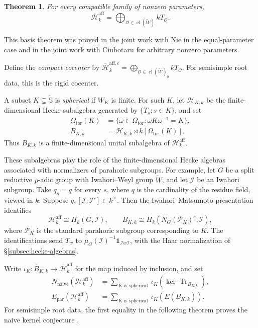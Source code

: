 \documentclass[11pt,letterpaper]{amsart}
\newtheorem{theorem}{Theorem}
\theoremstyle{definition}
\numberwithin{equation}{section}
\numberwithin{theorem}{section}
\newcommand{\kk}{k}
\newcommand{\CI}{\mathcal I}
\newcommand{\cH}{\mathcal H}
\newcommand{\bH}{\overline{\mathcal H}}
\newcommand{\cO}{\mathcal O}
\newcommand{\Wt}{\tilde W}
\newcommand{\Saff}{\widetilde{\mathbb S}}
\newcommand{\naive}{\mathrm{naive}}
\DeclareMathOperator{\Tr}{Tr}
\begin{document}
\begin{theorem}
\label{thm:affine-cocenter-basis}
For every compatible family of nonzero parameters,
\[
 \bH_\kk^{\mathrm{aff}}
   =\bigoplus_{\cO\in\operatorname{cl}(\Wt)}
      \kk T_\cO.
\]
\end{theorem}

This basis theorem was proved in the joint work with Nie \cite[Theorem~6.7]{HN14} in the equal-parameter case and in the joint work with Ciubotaru \cite[Theorem~8.1]{CH} for arbitrary nonzero parameters. 

Define the \emph{compact cocenter} by $\bH_\kk^{\mathrm{aff},c}=\bigoplus_{\cO\in\operatorname{cl}(\Wt)_0} \kk T_\cO$. For semisimple root data, this is the rigid cocenter.

A subset $K\subseteq\Saff$ is \emph{spherical} if $W_K$
is finite. For such $K$, let $\cH_{K,\kk}$ be the finite-dimensional Hecke subalgebra generated by $\{T_s:s\in K\}$, and set
\[
 \begin{aligned}
 \Omega_{\mathrm{tor}}(K)
   &=\{\omega\in\Omega_{\mathrm{tor}}:
                        \omega K\omega^{-1}=K\},\\
 B_{K,\kk}
   &=\cH_{K,\kk}\rtimes
                       \kk[\Omega_{\mathrm{tor}}(K)].
 \end{aligned}
\]
Thus $B_{K,\kk}$ is a finite-dimensional unital
subalgebra of $\cH_\kk^{\mathrm{aff}}$. 

These subalgebras play the role of the finite-dimensional Hecke algebras associated with normalizers of parahoric subgroups. For example, let $G$
be a split reductive $p$-adic group with Iwahori--Weyl
group $\Wt$, and let $\CI$ be an Iwahori subgroup.
Take $q_s=q$ for every $s$, where $q$ is the cardinality of the residue field, viewed in $\kk$. Suppose $q, [\CI:\CI']\in\kk^\times$. Then the Iwahori--Matsumoto
presentation identifies
\[
 \cH_\kk^{\mathrm{aff}}\cong H_\kk(G,\CI),
 \qquad
 B_{K,\kk}\cong
 H_\kk(N_G(\mathcal P_K)^c,\CI),
\]
where $\mathcal P_K$ is the standard parahoric subgroup
corresponding to $K$. The identifications send $T_w$ to $\mu_G(\CI)^{-1}\mathbf 1_{\CI\dot w\CI}$, with the Haar normalization of \S\ref{subsec:hecke-algebras}.

Write
$\iota_K:\bar B_{K,\kk}\to\bH_\kk^{\mathrm{aff}}$
for the map induced by inclusion, and set
\[
 \begin{aligned}
 N_{\naive}(\cH_\kk^{\mathrm{aff}})
   &=\sum_{K \text{ is spherical }}\iota_K(\ker\Tr_{B_{K,\kk}}),\\
 E_{\mathrm{par}}(\cH_\kk^{\mathrm{aff}})
   &=\sum_{K \text{ is spherical }}\iota_K(E(B_{K,\kk})).
 \end{aligned}
\]
For semisimple root data, the first equality in the following theorem proves the naive kernel conjecture \cite[Conjecture~3.13]{He16}.
\end{document}

